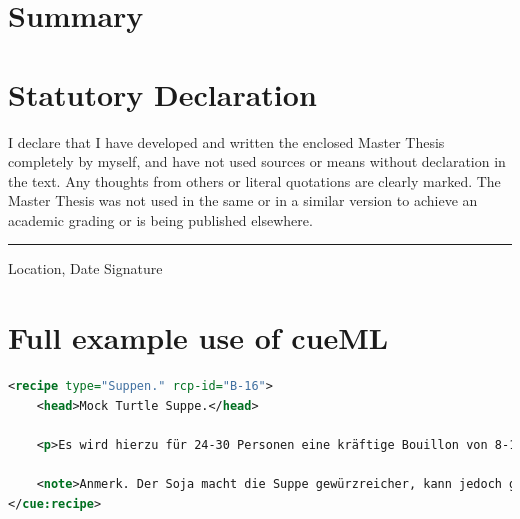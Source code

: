 \documentclass[12pt, twoside]{report}
\begin{document}
\chapter{Summary}


\appendix
\chapter{Statutory Declaration}
I declare that I have developed and written the enclosed Master Thesis completely by myself, and have not used sources or means without declaration in the text. Any thoughts from others or literal quotations are clearly marked. The Master Thesis was not used in the same or in a similar version to achieve an academic grading or is being published elsewhere.
\newline
\newline
\newline
\rule{\textwidth}{1pt}
Location, Date \hfill Signature 



\chapter{Full example use of cueML} \label{appendix:fullUseOfCueML}

\begin{lstlisting}[language=XML, caption={Without cueML}]
<recipe type="Suppen." rcp-id="B-16">
	<head>Mock Turtle Suppe.</head>
	
	<p>Es wird hierzu für 24-30 Personen eine kräftige Bouillon von 8-10 Pfund Rindfleisch mit Wurzelwerk gekocht. Zugleich bringt man einen großen Kalbskopf, eine Schweineschnauze und Ohren, einen Ochsengaumen und eine geräucherte Ochsenzunge zu Feuer und kocht dies Alles gahr, aber nicht zu weich. Kalt, schneidet man es in kleine, länglich viereckige Stückchen, gibt das Fleisch in die Bouillon, nebst braunem Gewürz, ein Paar Messerspitzen Cayenne-Pfeffer, einige Kalbsmidder in Stückchen geschnitten (siehe Vorbereitungsregeln), kleine Saucissen, so viel Kalbskopfbrühe, daß man hinreichend Suppe hat, und macht dies mit in Butter braun gemachtem Mehl gebunden. Nachdem dies Alles 1/4 Stunde gekocht hat, kommen noch Klöße von Kalbfleisch, einige hart gekochte Eier in Würfel geschnitten, ein Paar Eßlöffel Engl. Soja hinzu, und wenn die Klößchen einige Minuten gekocht haben, 1/2 Flasche Madeira und auch Austern, wenn man sie haben kann. Dann wird die Suppe sogleich angerichtet.</p>
	
	<note>Anmerk. Der Soja macht die Suppe gewürzreicher, kann jedoch gut wegbleiben, und statt Madeira kann man weißen Franzwein und etwas Rum nehmen. Sowohl die Bouillon als Kalbskopf können schon am vorhergehenden Tage, ohne Nachtheil der Suppe, gekocht werden. </note>
</cue:recipe>
\end{lstlisting}
\end{document}
